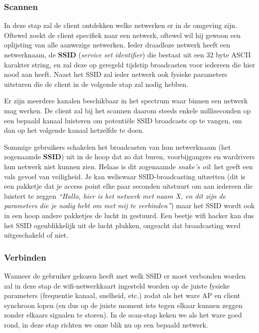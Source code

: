 \documentclass[
  10pt,
  dutch,
  paper=a4,
  ,captions=tableheading
]{scrbook}
\begin{document}
\subsubsection{Scannen}\label{scannen}

In deze stap zal de client ontdekken welke netwerken er in de omgeving
zijn. Oftewel zoekt de client specifiek naar een netwerk, oftewel wil
hij gewoon een oplijsting van alle aanwezige netwerken. Ieder draadloze
netwerk heeft een netwerknaam, de \textbf{SSID} (\emph{service set
identifier}) die bestaat uit een 32 byte ASCII karakter string, en zal
deze op geregeld tijdstip broadcasten voor iedereen die hier nood aan
heeft. Naast het SSID zal ieder netwerk ook fysieke parameters uitsturen
die de client in de volgende stap zal nodig hebben.

Er zijn meerdere kanalen beschikbaar in het spectrum waar binnen een
netwerk mag werken. De client zal bij het scannen daarom steeds enkele
milliseconden op een bepaald kanaal luisteren om potentiële SSID
broadcasts op te vangen, om dan op het volgende kanaal hetzelfde te
doen.

\begin{tipblock}
Sommige gebruikers schakelen het broadcasten van hun netwerknaam (het
zogenaamde \textbf{SSID}) uit in de hoop dat zo dat buren,
voorbijgangers en wardrivers hun netwerk niet kunnen zien. Helaas is dit
zogenaamde \emph{snake's oil}: het geeft een vals gevoel van veiligheid.
Je kan weliswaar SSID-broadcasting uitzetten (dit is een pakketje dat je
access point elke paar seconden uitstuurt om aan iedereen die luistert
te zeggen \emph{``Hallo, hier is het netwerk met naam X, en dit zijn de
parameters die je nodig hebt om met mij te verbinden''}) maar het SSID
wordt ook in een hoop andere pakketjes de lucht in gestuurd. Een beetje
wifi hacker kan dus het SSID ogenblikkelijk uit de lucht plukken,
ongeacht dat broadcasting werd uitgeschakeld of niet.
\end{tipblock}

\subsubsection{Verbinden}\label{verbinden}

Wanneer de gebruiker gekozen heeft met welk SSID er moet verbonden
worden zal in deze stap de wifi-netwerkkaart ingesteld worden op de
juiste fysieke parameters (frequentie kanaal, snelheid, etc.) zodat als
het ware AP en client synchroon lopen (en dus op de juiste moment iets
tegen elkaar kunnen zeggen zonder elkaars signalen te storen). In de
scan-stap keken we als het ware goed rond, in deze stap richten we onze
blik nu op een bepaald netwerk.
\end{document}
